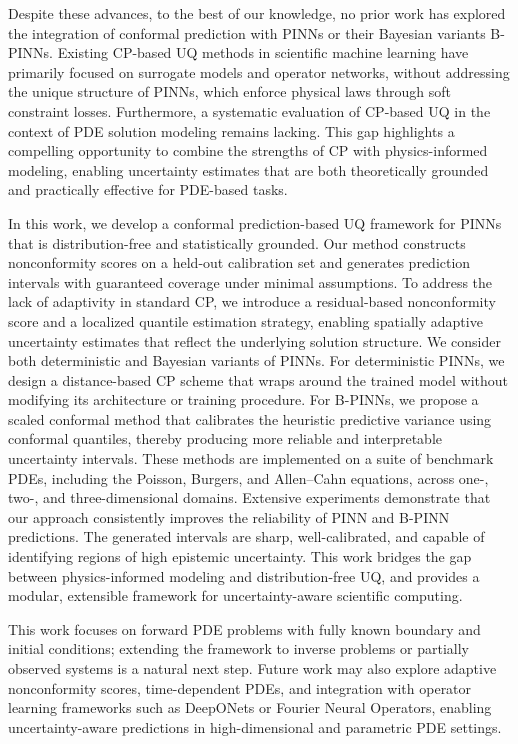 \documentclass[preprint,12pt]{elsarticle}
\begin{document}
Despite these advances, to the best of our knowledge, no prior work has explored the integration of conformal prediction with PINNs or their Bayesian variants B-PINNs. Existing CP-based UQ methods in scientific machine learning have primarily focused on surrogate models and operator networks, without addressing the unique structure of PINNs, which enforce physical laws through soft constraint losses. Furthermore, a systematic evaluation of CP-based UQ in the context of PDE solution modeling remains lacking. This gap highlights a compelling opportunity to combine the strengths of CP with physics-informed modeling, enabling uncertainty estimates that are both theoretically grounded and practically effective for PDE-based tasks.

% 
In this work, we develop a conformal prediction-based UQ framework for PINNs that is distribution-free and statistically grounded. Our method constructs nonconformity scores on a held-out calibration set and generates prediction intervals with guaranteed coverage under minimal assumptions. To address the lack of adaptivity in standard CP, we introduce a residual-based nonconformity score and a localized quantile estimation strategy, enabling spatially adaptive uncertainty estimates that reflect the underlying solution structure. We consider both deterministic and Bayesian variants of PINNs. For deterministic PINNs, we design a distance-based CP scheme that wraps around the trained model without modifying its architecture or training procedure. For B-PINNs, we propose a scaled conformal method that calibrates the heuristic predictive variance using conformal quantiles, thereby producing more reliable and interpretable uncertainty intervals. These methods are implemented on a suite of benchmark PDEs, including the Poisson, Burgers, and Allen–Cahn equations, across one-, two-, and three-dimensional domains. Extensive experiments demonstrate that our approach consistently improves the reliability of PINN and B-PINN predictions. The generated intervals are sharp, well-calibrated, and capable of identifying regions of high epistemic uncertainty. This work bridges the gap between physics-informed modeling and distribution-free UQ, and provides a modular, extensible framework for uncertainty-aware scientific computing.

% 
This work focuses on forward PDE problems with fully known boundary and initial conditions; extending the framework to inverse problems or partially observed systems is a natural next step. Future work may also explore adaptive nonconformity scores, time-dependent PDEs, and integration with operator learning frameworks such as DeepONets or Fourier Neural Operators, enabling uncertainty-aware predictions in high-dimensional and parametric PDE settings.
\end{document}
